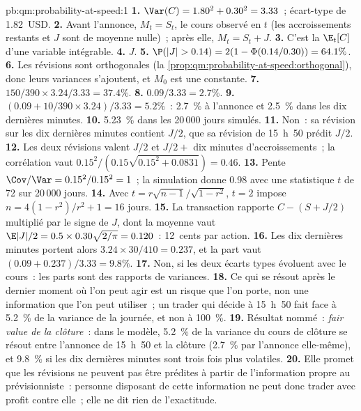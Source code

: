 \begin{solution}{pb:qm:probability-at-speed:1}
\textbf{1.} $\Var(C) = 1.80^2 + 0.30^2 = 3.33$~; écart-type de 1.82~USD.
\textbf{2.} Avant l'annonce, $M_t = S_t$, le cours observé en $t$ (les accroissements restants
et $J$ sont de moyenne nulle)~; après elle, $M_t = S_t + J$.
\textbf{3.} C'est la  $\E_t[C]$ d'une variable intégrable.
\textbf{4.} $J$.
\textbf{5.} $\P(|J| > 0.14) = 2(1 - \Phi(0.14/0.30)) = 64.1\%$.
\textbf{6.} Les révisions sont orthogonales (la \cref{prop:qm:probability-at-speed:orthogonal}), donc
leurs variances s'ajoutent, et $M_0$ est une constante.
\textbf{7.} $150/390 \times 3.24/3.33 = 37.4\%$.
\textbf{8.} $0.09/3.33 = 2.7\%$.
\textbf{9.} $(0.09 + 10/390 \times 3.24)/3.33 = 5.2\%$~: 2.7~\% à l'annonce et 2.5~\% dans les
dix dernières minutes.
\textbf{10.} 5.23~\% dans les 20\,000 jours simulés.
\textbf{11.} Non~: sa révision sur les dix dernières minutes contient $J/2$, que sa
révision de 15~h~50 prédit $J/2$.
\textbf{12.} Les deux révisions valent $J/2$ et $J/2 + $ dix minutes d'accroissements~; la
corrélation vaut $0.15^2/(0.15\sqrt{0.15^2 + 0.0831}) = 0.46$.
\textbf{13.} Pente $\Cov/\Var = 0.15^2/0.15^2 = 1$~; la simulation donne 0.98 avec une
statistique $t$ de 72 sur 20\,000 jours.
\textbf{14.} Avec $t = r\sqrt{n - 1}/\sqrt{1 - r^2}$, $t = 2$ impose $n = 4(1 - r^2)/r^2 + 1 =
16$ jours.
\textbf{15.} La transaction rapporte $C - (S + J/2)$ multiplié par le signe de $J$, dont la moyenne vaut $\E|J|/2 =
0.5 \times 0.30\sqrt{2/\pi} = 0.120$~: 12~cents par action.
\textbf{16.} Les dix dernières minutes portent alors $3.24 \times 30/410 = 0.237$, et la part vaut
$(0.09 + 0.237)/3.33 = 9.8\%$.
\textbf{17.} Non, si les deux écarts types évoluent avec le cours~: les parts sont des rapports de
variances.
\textbf{18.} Ce qui se résout après le dernier moment où l'on peut agir est un risque que l'on porte, non
une information que l'on peut utiliser~; un trader qui décide à 15~h~50 fait face à 5.2~\% de la variance de la journée,
et non à 100~\%.
\textbf{19.} Résultat nommé~: \emph{fair value de la clôture}~: dans le modèle, 5.2~\% de la
variance du cours de clôture se résout entre l'annonce de 15~h~50 et la clôture (2.7~\% par
l'annonce elle-même), et 9.8~\% si les dix dernières minutes sont trois fois plus volatiles.
\textbf{20.} Elle promet que les révisions ne peuvent pas être prédites à partir de l'information propre au
prévisionniste~: personne disposant de cette information ne peut donc trader avec profit contre elle~; elle
ne dit rien de l'exactitude.
\end{solution}

